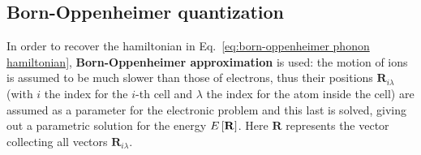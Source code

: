 \subsection{Born-Oppenheimer quantization}

In order to recover the hamiltonian in Eq.~\eqref{eq:born-oppenheimer phonon hamiltonian}, \textbf{Born-Oppenheimer approximation} is used: the motion of ions is assumed to be much slower than those of electrons, thus their positions $\mathbf{R}_{i\lambda}$ (with $i$ the index for the $i$-th cell and $\lambda$ the index for the atom inside the cell) are assumed as a parameter for the electronic problem and this last is solved, giving out a parametric solution for the energy $E\left[{\mathbf{R}}\right]$. Here $\mathbf{R}$ represents the vector collecting all vectors $\mathbf{R}_{i\lambda}$.

